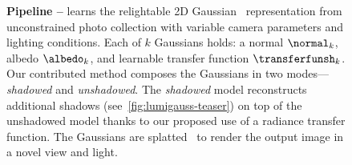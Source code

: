 \begin{figure}[!t]
  \centering
  \myscheme
  \vspace{-2em}
  \caption[Pipeline of \lumigauss]{
    \textbf{Pipeline --}
    \lumigauss learns the relightable 2D Gaussian~\cite{zhang2024gaussian} representation from unconstrained photo collection with variable camera parameters and lighting conditions.
    Each of $k$ Gaussians holds: a normal $\normal_k$, albedo $\albedo_k$, and
    learnable transfer function $\transferfunsh_k$.
    Our contributed method composes the Gaussians in two modes---\textit{shadowed}
    and \textit{unshadowed}.
    The \textit{shadowed} model reconstructs additional shadows
    (see~\cref{fig:lumigauss-teaser}) on top of the unshadowed model thanks to our
    proposed use of a radiance transfer function.
    The Gaussians are splatted~\cite{kerbl20233d,zhang2024gaussian} to render the
    output image in a novel view and light.
  }
  \label{fig:lumigauss-scheme}
  \vspace{-1.1em}
\end{figure}